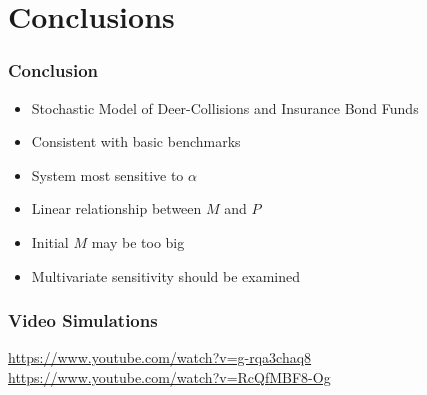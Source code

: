 \section{Conclusions}

\begin{frame}
    \frametitle{Conclusion}
\begin{itemize}
	\item Stochastic Model of Deer-Collisions and Insurance Bond Funds 
	\item Consistent with basic benchmarks
	\item System most sensitive to $\alpha$
	\item Linear relationship between $M$ and $P$
	\item Initial $M$ may be too big
	\item Multivariate sensitivity should be examined
\end{itemize}
\end{frame}

\begin{frame}
    \frametitle{Video Simulations}
	\url{ https://www.youtube.com/watch?v=g-rqa3chaq8}\\
	\url{https://www.youtube.com/watch?v=RcQfMBF8-Og}
\end{frame}


